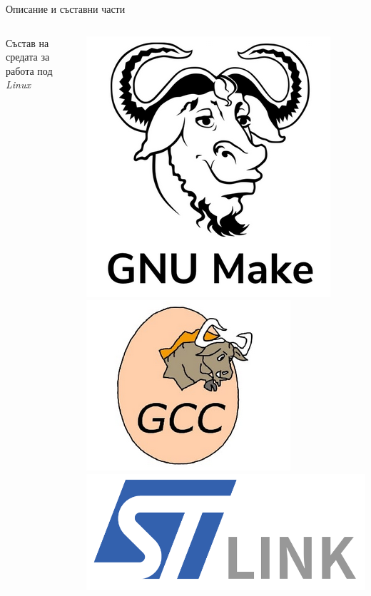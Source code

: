 \documentclass{beamer}
\begin{document}
\begin{frame}{Описание и съставни части}
\begin{columns}
\begin{block}{ Състав на средата за работа под \textit{Linux}}
\begin{itemize}
			\end{itemize}
		\end{block}
		\pause
			\includegraphics[width=0.95\linewidth]{Images/make.png} \\[0.5em]
			\includegraphics[width=0.95\linewidth]{Images/gcc.png}
			\includegraphics[width=0.95\linewidth]{Images/st-link.png} \\[0.5em]

\end{columns}
\end{frame}
\end{document}
